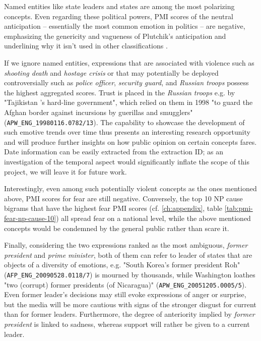 Named entities like state leaders and states are among the most polarizing concepts. Even regarding these political powers, PMI scores of the neutral anticipation -- essentially the most common emotion in politics -- are negative, emphasizing the genericity and vagueness of Plutchik's anticipation and underlining why it isn't used in other classifications
\cite{ekman_basic_emotions}.

If we ignore named entities, expressions that are associated with violence such as \textit{shooting death} and \textit{hostage crisis} or that may potentially be deployed controversially such as \textit{police officer}, \textit{security guard}, and \textit{Russian troops} possess the highest aggregated scores. Trust is placed in the \textit{Russian troops} e.g. by "Tajikistan 's hard-line government", which relied on them in 1998 "to guard the Afghan border against incursions by guerillas and smugglers" (\texttt{APW\_ENG\_19980116.0782/13}). The capability to showcase the development of such emotive trends over time thus presents an interesting research opportunity and will produce further insights on how public opinion on certain concepts fares. Date information can be easily extracted from the extraction ID; as an investigation of the temporal aspect would significantly inflate the scope of this project, we will leave it for future work.

Interestingly, even among such potentially violent concepts as the ones mentioned above, PMI scores for fear are still negative. Conversely, the top 10 NP cause bigrams that have the highest fear PMI scores (cf. \ref{ch:appendix}, table \ref{tab:pmi-fear-np-cause-10}) all spread fear on a national level, while the above mentioned concepts would be condemned by the general public rather than scare it.

Finally, considering the two expressions ranked as the most ambiguous, \textit{former president} and \textit{prime minister}, both of them can refer to leader of states that are objects of a diversity of emotions, e.g. "South Korea's former president Roh" (\texttt{AFP\_ENG\_20090528.0118/7}) is mourned by thousands, while Washington loathes "two (corrupt) former presidents (of Nicaragua)" (\texttt{APW\_ENG\_20051205.0005/5}). Even former leader's decisions may still evoke expressions of anger or surprise, but the media will be more cautious with signs of the stronger disgust for current than for former leaders. Furthermore, the degree of anteriority implied by \textit{former president} is linked to sadness, whereas support will rather be given to a current leader.

